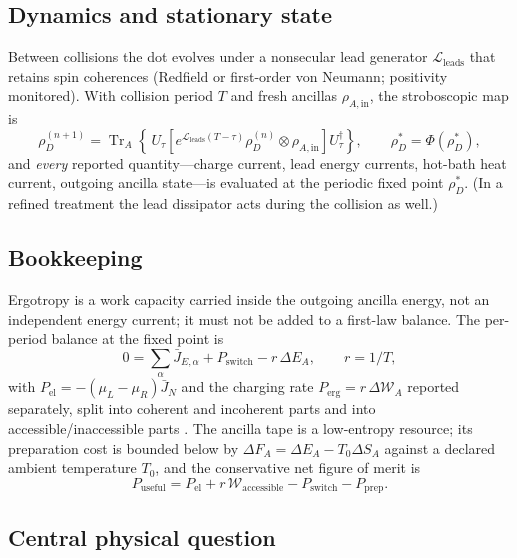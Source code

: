 \documentclass[11pt,a4paper]{article}
\newcommand{\Tr}{\operatorname{Tr}}
\begin{document}
\subsection{Dynamics and stationary state}

Between collisions the dot evolves under a nonsecular lead generator $\mathcal L_{\mathrm{leads}}$ that retains spin coherences (Redfield or first-order von Neumann; positivity monitored). With collision period $T$ and fresh ancillas $\rho_{A,\mathrm{in}}$, the stroboscopic map is
\begin{equation}\label{eq:map}
\rho_D^{(n+1)}=\Tr_A\!\left\{\,U_\tau\left[e^{\mathcal L_{\mathrm{leads}}(T-\tau)}\rho_D^{(n)}\otimes\rho_{A,\mathrm{in}}\right]U_\tau^\dagger\right\},
\qquad
\rho_D^{*}=\Phi(\rho_D^{*}),
\end{equation}
and \emph{every} reported quantity---charge current, lead energy currents, hot-bath heat current, outgoing ancilla state---is evaluated at the periodic fixed point $\rho_D^*$. (In a refined treatment the lead dissipator acts during the collision as well.)

\subsection{Bookkeeping}

Ergotropy is a work capacity carried inside the outgoing ancilla energy, not an independent energy current; it must not be added to a first-law balance. The per-period balance at the fixed point is
\begin{equation}
0=\sum_\alpha \bar J_{E,\alpha}+P_{\mathrm{switch}}-r\,\Delta E_A,\qquad r=1/T,
\end{equation}
with $P_{\mathrm{el}}=-(\mu_L-\mu_R)\bar J_N$ and the charging rate $P_{\mathrm{erg}}=r\,\Delta\mathcal W_A$ reported separately, split into coherent and incoherent parts \cite{Francica} and into accessible/inaccessible parts \cite{RefFrames}. The ancilla tape is a low-entropy resource; its preparation cost is bounded below by $\Delta F_A=\Delta E_A-T_0\Delta S_A$ against a declared ambient temperature $T_0$, and the conservative net figure of merit is
\begin{equation}
P_{\mathrm{useful}}=P_{\mathrm{el}}+r\,\mathcal W_{\mathrm{accessible}}-P_{\mathrm{switch}}-P_{\mathrm{prep}}.
\end{equation}

\subsection{Central physical question}
\end{document}
